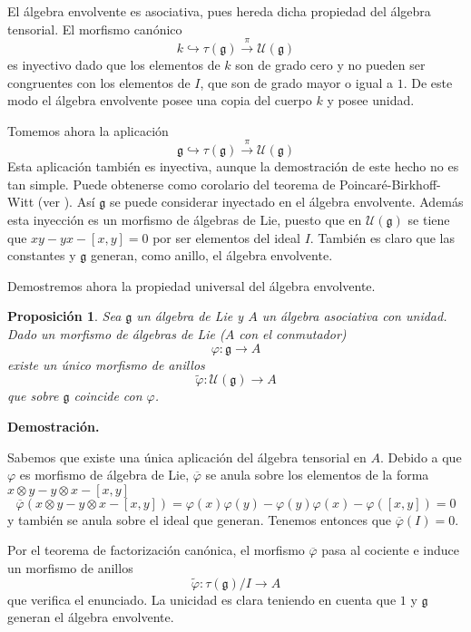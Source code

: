 \documentclass[a4paper,draft,12pt]{article}
\newtheorem{propo}[teo]{Proposición}%
\newcommand{\dem}{\noindent \textbf{Demostración. }\vspace{0.3 cm}}%
\newcommand{\uni}{\mathcal{U}}%
\newcommand{\lto}{\longrightarrow}%
\begin{document}
El álgebra envolvente es asociativa, pues hereda dicha propiedad del álgebra tensorial.  El morfismo canónico
$$
k \hookrightarrow \tau(\mathfrak{g}) \stackrel{\pi}{\lto} \uni(\mathfrak{g})
$$
es inyectivo dado que los elementos de $k$ son de grado cero y no pueden ser congruentes con los elementos de $I$, que son de grado mayor o igual a $1$.  De este modo el álgebra envolvente posee una copia del cuerpo $k$ y posee unidad.

Tomemos ahora la aplicación
$$
\mathfrak{g} \hookrightarrow \tau(\mathfrak{g}) \stackrel{\pi}{\lto} \uni(\mathfrak{g})
$$
Esta aplicación también es inyectiva, aunque la demostración de este hecho no es tan simple. Puede obtenerse como corolario del teorema de Poincaré-Birkhoff-Witt (ver \cite{humint}). Así $\mathfrak{g}$ se puede considerar inyectado en el álgebra envolvente.  Además esta inyección es un morfismo de álgebras de Lie, puesto que en $\uni(\mathfrak{g})$ se tiene que $xy-yx-[x,y]=0$ por ser elementos del ideal $I$.  También es claro que las constantes y $\mathfrak{g}$ generan, como anillo, el álgebra envolvente.

Demostremos ahora la propiedad universal del álgebra envolvente.

\begin{propo}

Sea $\mathfrak{g}$ un álgebra de Lie y $A$ un álgebra asociativa con unidad.  Dado un morfismo de álgebras de Lie ($A$ con el conmutador)
$$
\varphi: \mathfrak{g}\lto A
$$
existe un único morfismo de anillos
$$
\tilde \varphi: \uni(\mathfrak{g}) \lto A
$$
que sobre $\mathfrak{g}$ coincide con $\varphi$.

\end{propo}

\dem

Sabemos que existe una única aplicación del álgebra tensorial en $A$.  Debido a que $\varphi$ es morfismo de álgebra de Lie, $\overline{\varphi}$ se anula sobre los elementos de la forma $x \otimes y - y \otimes x -[x,y]$
$$
\overline{\varphi}(x \otimes y -y \otimes x - [x,y])= \varphi(x)\varphi(y)- \varphi(y)\varphi(x)- \varphi([x,y])=0
$$
y también se anula sobre el ideal que generan.  Tenemos entonces que $\overline{\varphi}(I)=0$.

Por el teorema de factorización canónica, el morfismo $\overline{\varphi}$ pasa al cociente e induce un morfismo de anillos
$$
\tilde \varphi: \tau(\mathfrak{g})/I \lto A
$$
que verifica el enunciado. La unicidad es clara teniendo en cuenta que $1$ y $\mathfrak{g}$ generan el álgebra envolvente.
\end{document}

